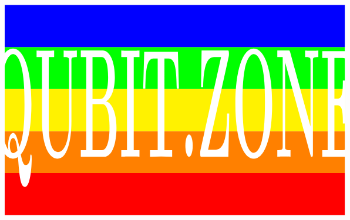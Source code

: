 \documentclass[handout,aspectratio=169]{beamer}
\begin{document}
{
\begin{frame}
\vspace{-20pt}
\[
\hspace{-2cm}
\begin{tikzpicture}[xscale=1.2, yscale=1.8]
\foreach \x/\y in {0/red,1/orange,2/yellow,3/green,4/blue} {
  \path [fill=\y] (0,\x) rectangle +(\textwidth,1);
}
\path [use as bounding box] (current bounding box.south west) rectangle (current bounding box.north east);
\node [scale=2.5, white, yscale=3.04] at (0.5*\textwidth,2.29) {\Huge\bf QUBIT.ZONE};
\end{tikzpicture}
\hspace{-2cm}
\]

\end{frame}
}

\addtocounter{framenumber}{-1}



\end{document}
